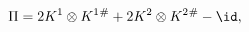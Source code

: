 \begin{equation}
   \Pi = 2K^1\otimes K^1{}^\# + 2K^2\otimes K^2{}^\# - \id , 
\label{prodstr1}
\end{equation}

